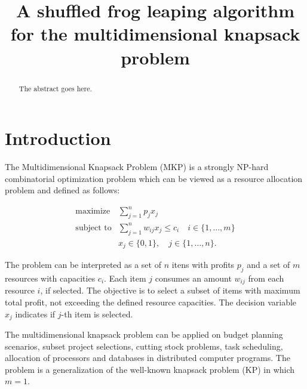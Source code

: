 \documentclass[conference, compsocconf]{IEEEtran}
\begin{document}
\title{A shuffled frog leaping algorithm for
the multidimensional knapsack problem}

\author{
\and
{}
}

\maketitle

\begin{abstract}
The abstract goes here.
\end{abstract}

\section{Introduction}
\label{sec:intro}

The Multidimensional Knapsack Problem (MKP) is a strongly NP-hard combinatorial
optimization problem which can be viewed as a resource allocation problem and
defined as follows:

\begin{align*}
  \text{maximize} & \sum_{j=1}^n p_j x_j \\
  \text{subject to} & \sum_{j=1}^n w_{ij} x_j \leqslant c_i \quad i \in \{1, \ldots, m\}\\
   & x_j \in \{0, 1\}, \quad j \in \{1, \ldots, n\}.
\end{align*}

The problem can be interpreted as a set of $n$ itens with profits $p_j$
and a set of $m$ resources with capacities $c_i$.
Each item $j$ consumes an amount $w_{ij}$ from each resource $i$, if selected.
The objective is to select a subset of items with maximum total profit,
not exceeding the defined resource capacities.
The decision variable $x_j$ indicates if $j$-th item is selected.

The multidimensional knapsack problem can be applied on budget planning 
scenarios, subset project selections, cutting stock problems, task scheduling,
allocation of processors and databases in distributed computer programs.
The problem is a generalization of the well-known knapsack problem (KP) in which
$m = 1$.
\end{document}
